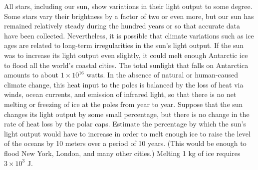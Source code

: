 All stars, including our sun, show variations in their
light output to some degree. Some stars vary their
brightness by a factor of two or even more, but our sun has
remained relatively steady during the hundred years or so
that accurate data have been collected. Nevertheless, it is
possible that climate variations such as ice ages are
related to long-term irregularities in the sun's light
output. If the sun was to increase its light output even
slightly, it could melt enough Antarctic ice to
flood all the world's coastal cities. The total sunlight
that falls on Antarctica amounts to about $1\times10^{16}$
watts. In the absence of natural or human-caused climate change, this heat input to the poles is balanced
by the loss of heat via winds, ocean currents, and emission
of infrared light, so that there is no net melting or
freezing of ice at the poles from year to year. Suppose that
the sun changes its light output by some small percentage,
but there is no change in the rate of heat loss by the polar
caps. Estimate the percentage by which the sun's light
output would have to increase in order to melt enough ice to
raise the level of the oceans by 10 meters over a period of
10 years. (This would be enough to flood New York, London,
and many other cities.) Melting 1 kg of ice requires $3\times10^3$ J.
